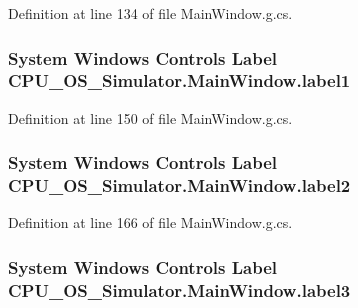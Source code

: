 Definition at line 134 of file Main\+Window.\+g.\+cs.

\hypertarget{class_c_p_u___o_s___simulator_1_1_main_window_a09b3ba374a620331bc447b32959260c2}{}
\subsubsection[{label1}]{\setlength{\rightskip}{0pt plus 5cm}System Windows Controls Label C\+P\+U\+\_\+\+O\+S\+\_\+\+Simulator.\+Main\+Window.\+label1\hspace{0.3cm}{\ttfamily [package]}}\label{class_c_p_u___o_s___simulator_1_1_main_window_a09b3ba374a620331bc447b32959260c2}


Definition at line 150 of file Main\+Window.\+g.\+cs.

\hypertarget{class_c_p_u___o_s___simulator_1_1_main_window_a88c7b6748a5e198c673a3c3c5178d3b8}{}
\subsubsection[{label2}]{\setlength{\rightskip}{0pt plus 5cm}System Windows Controls Label C\+P\+U\+\_\+\+O\+S\+\_\+\+Simulator.\+Main\+Window.\+label2\hspace{0.3cm}{\ttfamily [package]}}\label{class_c_p_u___o_s___simulator_1_1_main_window_a88c7b6748a5e198c673a3c3c5178d3b8}


Definition at line 166 of file Main\+Window.\+g.\+cs.

\hypertarget{class_c_p_u___o_s___simulator_1_1_main_window_a94cf4fbdaebb09776745893c2bce1126}{}
\subsubsection[{label3}]{\setlength{\rightskip}{0pt plus 5cm}System Windows Controls Label C\+P\+U\+\_\+\+O\+S\+\_\+\+Simulator.\+Main\+Window.\+label3\hspace{0.3cm}{\ttfamily [package]}}\label{class_c_p_u___o_s___simulator_1_1_main_window_a94cf4fbdaebb09776745893c2bce1126}


